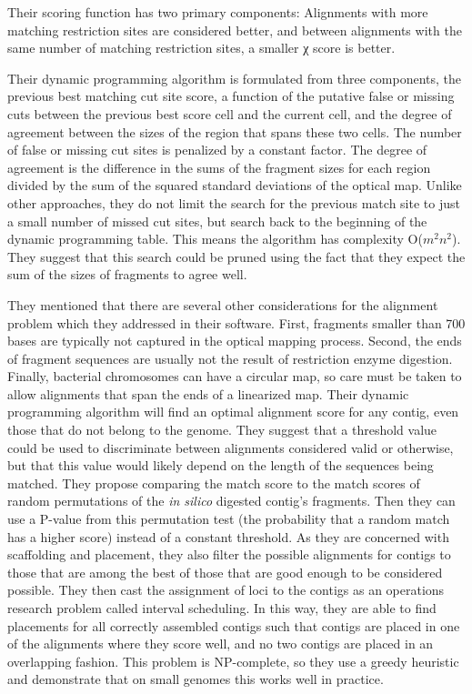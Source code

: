 \documentclass[doctor]{thesis}
\begin{document}
Their scoring function has two primary components: Alignments with more matching restriction sites are considered better, and between alignments with the same number of matching restriction sites, a smaller χ score is better.

Their dynamic programming algorithm is formulated from three components, the previous best matching cut site score, a function of the putative false or missing cuts between the previous best score cell and the current cell, and the degree of agreement between the sizes of the region that spans these two cells.
The number of false or missing cut sites is penalized by a constant factor.
The degree of agreement is the difference in the sums of the fragment sizes for each region divided by the sum of the squared standard deviations of the optical map.
Unlike other approaches, they do not limit the search for the previous match site to just a small number of missed cut sites, but search back to the beginning of the dynamic programming table.
This means the algorithm has complexity O($m^2n^2$).
They suggest that this search could be pruned using the fact that they expect the sum of the sizes of fragments to agree well.

They mentioned that there are several other considerations for the alignment problem which they addressed in their software.
First, fragments smaller than 700 bases are typically not captured in the optical mapping process.
Second, the ends of fragment sequences are usually not the result of restriction enzyme digestion.
Finally, bacterial chromosomes can have a circular map, so care must be taken to allow alignments that span the ends of a linearized map.
Their dynamic programming algorithm will find an optimal alignment score for any contig, even those that do not belong to the genome.
They suggest that a threshold value could be used to discriminate between alignments considered valid or otherwise, but that this value would likely depend on the length of the sequences being matched.
They propose comparing the match score to the match scores of random permutations of the \emph{in silico} digested contig’s fragments.
Then they can use a P-value from this permutation test (the probability that a random match has a higher score) instead of a constant threshold.
As they are concerned with scaffolding and placement, they also filter the possible alignments for contigs to those that are among the best of those that are good enough to be considered possible.
They then cast the assignment of loci to the contigs as an operations research problem called interval scheduling.
In this way, they are able to find placements for all correctly assembled contigs such that contigs are placed in one of the alignments where they score well, and no two contigs are placed in an overlapping fashion.
This problem is NP-complete, so they use a greedy heuristic and demonstrate that on small genomes this works well in practice.
\end{document}
